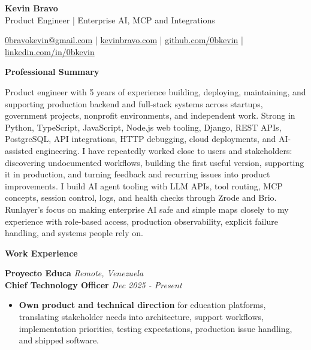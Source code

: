 \documentclass[10pt]{article}
\newcommand{\sectiontitle}[1]{%
    \vspace{3pt}
    \begin{center}
        \textbf{#1}
    \end{center}
    \vspace{-5pt}
}
\begin{document}
\raggedright

\begin{center}
    {\LARGE \textbf{Kevin Bravo}}\\
    Product Engineer | Enterprise AI, MCP and Integrations \\
    \hrulefill
\end{center}

\begin{center}
    \href{mailto:0bravokevin@gmail.com}{0bravokevin@gmail.com}
    | \href{https://kevinbravo.com}{kevinbravo.com}
    | \href{https://github.com/0bkevin}{github.com/0bkevin}
    | \href{https://www.linkedin.com/in/0bkevin/}{linkedin.com/in/0bkevin}
\end{center}

\fontsize{9.65}{10.65}\selectfont

\sectiontitle{Professional Summary}
Product engineer with 5 years of experience building, deploying, maintaining, and supporting production backend and full-stack systems across startups, government projects, nonprofit environments, and independent work. Strong in Python, TypeScript, JavaScript, Node.js web tooling, Django, REST APIs, PostgreSQL, API integrations, HTTP debugging, cloud deployments, and AI-assisted engineering. I have repeatedly worked close to users and stakeholders: discovering undocumented workflows, building the first useful version, supporting it in production, and turning feedback and recurring issues into product improvements. I build AI agent tooling with LLM APIs, tool routing, MCP concepts, session control, logs, and health checks through Zrode and Brio. Runlayer's focus on making enterprise AI safe and simple maps closely to my experience with role-based access, production observability, explicit failure handling, and systems people rely on.

\sectiontitle{Work Experience}
\textbf{Proyecto Educa} \hfill \textit{Remote, Venezuela} \\
\textbf{Chief Technology Officer} \hfill \textit{Dec 2025 - Present}
\begin{itemize}
    \item \textbf{Own product and technical direction} for education platforms, translating stakeholder needs into architecture, support workflows, implementation priorities, testing expectations, production issue handling, and shipped software.
\end{itemize}
\end{document}
